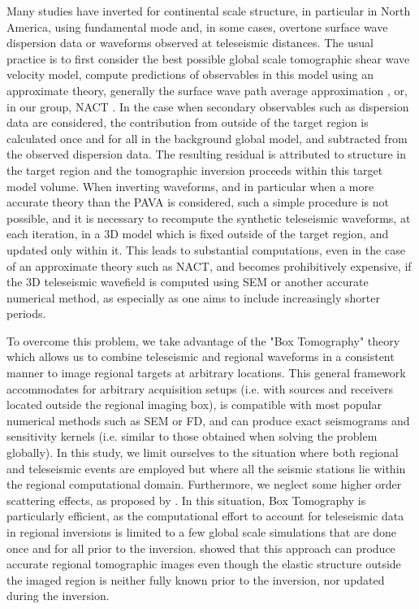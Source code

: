 \documentclass[12pt]{article}
\begin{document}
Many studies have inverted for continental scale structure, in particular in North America, using fundamental mode and, in some cases, overtone surface wave dispersion data or waveforms observed at teleseismic distances. 
The usual practice is to first consider the best possible global scale tomographic shear wave velocity model, compute predictions of observables in this model using an approximate theory, generally the surface wave path average approximation \citep[e.g.][]{nettles2008radially,bedle2009svelocity,schaeffer2014imaging}, or, in our group, NACT \citep{marone2007three,yuan20113}. 
In the case when secondary observables such as dispersion data are considered, the contribution from outside of the target region is calculated once and for all in the background global model, and subtracted from the observed dispersion data. 
The resulting residual is attributed to structure in the target region and the tomographic inversion proceeds within this target model volume. 
When inverting waveforms, and in particular when a more accurate theory than the PAVA is considered, such a simple procedure is not possible, and it is necessary to recompute the synthetic teleseismic waveforms, at each iteration, in a 3D model which is fixed outside of the target region, and updated only within it. 
This leads to substantial computations, even in the case of an approximate theory such as NACT, and becomes prohibitively expensive, if the 3D teleseismic wavefield is computed using SEM or another accurate numerical method, as especially as one aims to include increasingly shorter periods.

To overcome this problem, we take advantage of the "Box Tomography" theory which allows us to combine teleseismic and regional waveforms in a consistent manner to image regional targets at arbitrary locations. 
This general framework accommodates for arbitrary acquisition setups (i.e. with sources and receivers located outside the regional imaging box), is compatible with most popular numerical methods such as SEM or FD, and can produce exact seismograms and sensitivity kernels (i.e. similar to those obtained when solving the problem globally). 
In this study, we limit ourselves to the situation where both regional and teleseismic events are employed but where all the seismic stations lie within the regional computational domain. 
Furthermore, we neglect some higher order scattering effects, as proposed by \cite{masson2016box}. 
In this situation, Box Tomography is particularly efficient, as the computational effort  to account for teleseismic data in regional inversions is limited to a few global scale simulations that are done once and for all prior to the inversion. \cite{masson2016box} showed that this approach can produce accurate regional tomographic images even though the elastic structure outside the imaged region is neither fully known prior to the inversion, nor updated during the inversion.  
\end{document}
